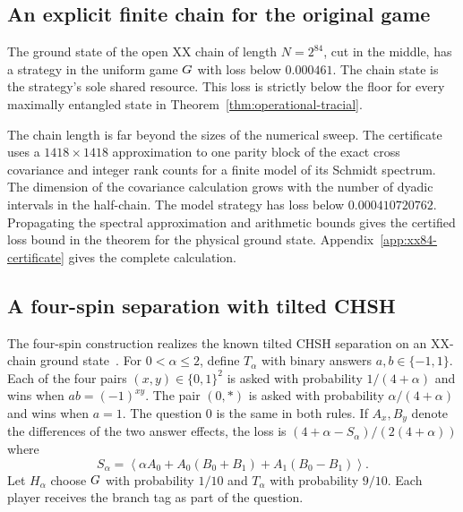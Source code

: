 \subsection{An explicit finite chain for the original game}\label{sec:xx84-separation}

\begin{theorem}\label{thm:xx84-separation}
The ground state of the open XX chain of length $N=2^{84}$, cut in the
middle, has a strategy in the uniform game $G$ with loss below
$0.000461$. The chain state is the strategy's sole shared
resource. This loss is strictly below the floor for every maximally
entangled state in Theorem~\ref{thm:operational-tracial}.
\end{theorem}

The chain length is far beyond the sizes of the numerical sweep. The
certificate uses a $1418\times1418$ approximation to one parity block
of the exact cross covariance and integer rank counts for a finite model
of its Schmidt spectrum. The dimension of the covariance calculation
grows with the number of dyadic intervals in the half-chain. The model
strategy has loss below $0.000410720762$. Propagating the spectral
approximation and arithmetic bounds gives the certified loss bound in
the theorem for the physical ground state. Appendix~\ref{app:xx84-certificate}
gives the complete calculation.

\subsection{A four-spin separation with tilted CHSH}
\label{sec:finite-chain-hybrid}

The four-spin construction realizes the known tilted CHSH separation on
an XX-chain ground state~\cite{AMP12,BP15}. For $0<\alpha\le2$, define
$T_\alpha$ with binary answers $a,b\in\{-1,1\}$.
Each of the four pairs $(x,y)\in\{0,1\}^2$ is asked with probability
$1/(4+\alpha)$ and wins when $ab=(-1)^{xy}$. The pair $(0,*)$ is asked
with probability $\alpha/(4+\alpha)$ and wins when $a=1$. The question
$0$ is the same in both rules. If $A_x,B_y$ denote the differences of the
two answer effects, the loss is $(4+\alpha-S_\alpha)/(2(4+\alpha))$ where
\begin{equation}\label{eq:tilted-score}
 S_\alpha=\left\langle\alpha A_0+A_0(B_0+B_1)+A_1(B_0-B_1)\right\rangle.
\end{equation}
Let $H_\alpha$ choose $G$ with probability $1/10$ and $T_\alpha$ with
probability $9/10$. Each player receives the branch tag as part of the question.

